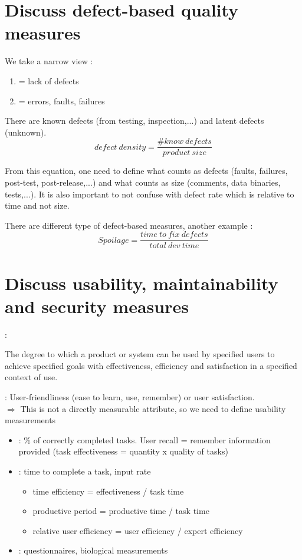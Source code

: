 \section{Discuss defect-based quality measures}

We take a narrow view : 
\begin{enumerate}
    \item {} = lack of defects
    \item {} = errors, faults, failures
\end{enumerate}
There are known defects (from testing, inspection,...) and latent defects (unknown). 
$$defect\ density = \frac{\#know\ defects}{product\ size}$$

From this equation, one need to define what counts as defects (faults, failures, post-test, post-release,...) and what counts as size (comments, data binaries, tests,...). It is also important to not confuse with
defect rate which is relative to time and not size.

There are different type of defect-based measures, another example :
$$Spoilage = \frac{time\ to\ fix\ defects}{total\ dev\ time}$$

\section{Discuss usability, maintainability and security measures}

 :

The degree to which a product or system can be used by specified users to achieve specified goals with effectiveness, efficiency and satisfaction in a specified context of use.

 : User-friendliness (ease to learn, use, remember) or user satisfaction.\\
$\Rightarrow$ This is not a directly measurable attribute, so we need to define usability measurements
\begin{itemize}
    \item {} : \% of correctly completed tasks. User recall = remember information provided (task effectiveness = quantity x quality of tasks)
    \item {} : time to complete a task, input rate
    \begin{itemize}
        \item time efficiency = effectiveness / task time
        \item productive period = productive time / task time
        \item relative user efficiency = user efficiency / expert efficiency
    \end{itemize}
    \item {} : questionnaires, biological measurements
\end{itemize}

